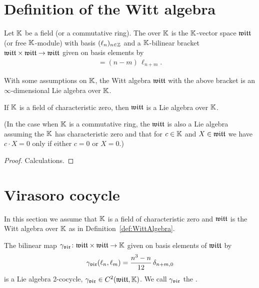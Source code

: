 \section{Definition of the Witt algebra}

\begin{definition}
  \label{def:WittAlgebra}
  \leanok
  Let $\mathbb{K}$ be a field (or a commutative ring). The  over $\mathbb{K}$ is
  the $\mathbb{K}$-vector space $\mathfrak{witt}$ (or free $\mathbb{K}$-module) with basis $(\ell_n)_{n \in \mathbb{Z}}$
  and a $\mathbb{K}$-bilinear bracket $\mathfrak{witt} \times \mathfrak{witt} \to \mathfrak{witt}$ given on basis
  elements by
  \begin{align*}
    [\ell_n , \ell_m] = (n-m) \, \ell_{n+m} .
  \end{align*}
\end{definition}

With some assumptions on $\mathbb{K}$, the Witt algebra $\mathfrak{witt}$ with the above
bracket is an $\infty$-dimensional Lie algebra over $\mathbb{K}$.

\begin{lemma}
  \label{lem:WittAlgebraIsLieAlgebra}
  \leanok
  If $\mathbb{K}$ is a field of characteristic zero, then $\mathfrak{witt}$ is
  a Lie algebra over $\mathbb{K}$.

  (In the case when $\mathbb{K}$ is a commutative ring, the $\mathfrak{witt}$ is also
  a Lie algebra assuming the $\mathbb{K}$ has characteristic zero and
  that for $c \in \mathbb{K}$ and $X \in \mathfrak{witt}$ we have $c \cdot X = 0$ only if
  either $c = 0$ or $X = 0$.)
\end{lemma}
\begin{proof}
  \leanok
  Calculations.
\end{proof}

\section{Virasoro cocycle}

In this section we assume that $\mathbb{K}$ is a field of characteristic zero
and $\mathfrak{witt}$ is the Witt algebra over $\mathbb{K}$ as in
Definition~\ref{def:WittAlgebra}.

\begin{definition}
  \label{def:VirasoroCocycle}
  \leanok
  The bilinear map $\gamma_{\mathfrak{vir}} \colon \mathfrak{witt} \times \mathfrak{witt} \to \mathbb{K}$
  given on basis elements of $\mathfrak{witt}$ by
  \begin{align*}
    \gamma_{\mathfrak{vir}}(\ell_n,\ell_m) = \frac{n^3 - n}{12} \, \delta_{n+m,0}
  \end{align*}
  is a Lie algebra 2-cocycle, $\gamma_{\mathfrak{vir}} \in C^2(\mathfrak{witt},\mathbb{K})$.
  We call $\gamma_{\mathfrak{vir}}$ the .
\end{definition}

